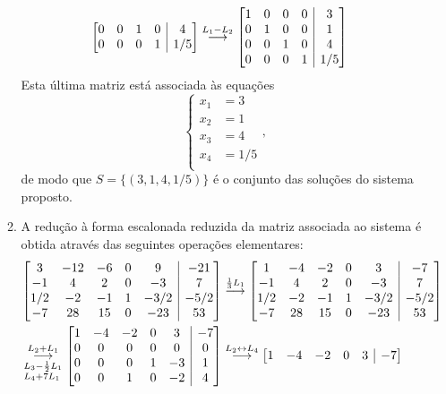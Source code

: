 \documentclass[12pt,a4paper]{article}
\makeatletter
\newenvironment{amatrix}[1]{%
  \left[\begin{array}{@{}*{#1}{c}|c@{}}
}{%
  \end{array}\right]
}
\newcommand{\grstep}[2][\relax]{%
   \ensuremath{\mathrel{
       {\mathop{\longrightarrow}\limits^{#2\mathstrut}_{
                                     \begin{subarray}{l} #1 \end{subarray}}}}}}
\makeatother
\begin{document}
\begin{enumerate}
\begin{enumerate}
\begin{align*}
\begin{amatrix}{4}
0 & 0 & 1 & 0 & 4 \\
0 & 0 & 0 & 1 & 1/5
\end{amatrix}
&
\grstep{ L_1 - L_2 }
\begin{amatrix}{4}
1 & 0 & 0 & 0 & 3 \\
0 & 1 & 0 & 0 & 1 \\
0 & 0 & 1 & 0 & 4 \\
0 & 0 & 0 & 1 & 1/5
\end{amatrix}
\end{align*}
Esta última matriz está associada às equações
\[
\left\{
\begin{aligned}
x_1 & = 3 \\
x_2 & = 1 \\
x_3 & = 4 \\
x_4 & = 1/5 \\
\end{aligned}
\right.,
\]
de modo que $S = \{ ( 3, 1, 4, 1/5 ) \}$ é o conjunto das soluções do sistema proposto.
\item A redução à forma escalonada reduzida da matriz associada ao sistema é obtida através das seguintes operações elementares:\begin{align*}
\begin{amatrix}{5}
  3 & -12 & -6 & 0 &    9 & -21 \\
 -1 &   4 &  2 & 0 &   -3 &  7 \\
1/2 &  -2 & -1 & 1 & -3/2 & -5/2 \\
 -7 &  28 & 15 & 0 & -23  & 53
\end{amatrix}
&
\grstep{ \frac{1}{3} L_1 }
\begin{amatrix}{5}
  1 & -4 & -2 &  0 &   3 & -7 \\
 -1 &  4 &  2 & 0 &  -3 &   7 \\
1/2 & -2 & -1 & 1 & -3/2 & -5/2 \\
 -7 & 28 & 15 & 0 & -23 & 53
\end{amatrix} \\
\grstep[ L_3 - \frac{1}{2} L_1 \\ L_4 + 7 L_1 ]{ L_2 + L_1 }
\begin{amatrix}{5}
1 & -4 & -2 &   0 &  3 & -7 \\
0 &  0 &  0 &   0 &  0 &  0 \\
0 &  0 &  0 &   1 & -3 & 1 \\
0 &  0 &  1 &   0 & -2 & 4
\end{amatrix}
&
\grstep{ L_2 \leftrightarrow L_4 }
\begin{amatrix}{5}
1 & -4 & -2 &   0 &  3 & -7 \\

\end{amatrix}
\end{align*}
\end{enumerate}
\end{enumerate}
\end{document}
